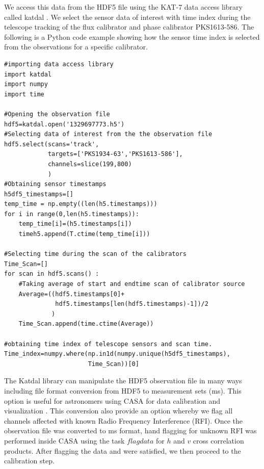 We access this data from the HDF5 file using the KAT-7 data access library called katdal \citep{molenaar2017kern}. We select the sensor data of interest with time index during the telescope tracking of the flux calibrator and phase calibrator PKS1613-586. The following is a Python code example showing how the sensor time index is selected from the observations for a specific calibrator.

\begin{tcolorbox}
\begin{lstlisting}
#importing data access library
import katdal
import numpy
import time

#Opening the observation file 
hdf5=katdal.open('1329697773.h5')
#Selecting data of interest from the the observation file
hdf5.select(scans='track',
            targets=['PKS1934-63','PKS1613-586'],
            channels=slice(199,800)
            )   
#Obtaining sensor timestamps            
h5df5_timestamps=[]
temp_time = np.empty((len(h5.timestamps)))
for i in range(0,len(h5.timestamps)):
    temp_time[i]=(h5.timestamps[i])
    timeh5.append(T.ctime(temp_time[i]))      
       
#Selecting time during the scan of the calibrators
Time_Scan=[]
for scan in hdf5.scans() :
    #Taking average of start and endtime scan of calibrator source
    Average=((hdf5.timestamps[0]+
              hdf5.timestamps[len(hdf5.timestamps)-1])/2
             ) 
    Time_Scan.append(time.ctime(Average))
    
#obtaining time index of telescope sensors and scan time.
Time_index=numpy.where(np.in1d(numpy.unique(h5df5_timestamps),
                       Time_Scan))[0]
\end{lstlisting}
\end{tcolorbox}

 The Katdal library can manipulate the HDF5 observation file in many ways including file format conversion from HDF5 to measurement sets (ms). This option is useful for astronomers using CASA for data calibration and visualization \citep{foley2016engineering}. This conversion also provide an option whereby we flag all channels affected with known Radio Frequency Interference (RFI). Once the observation file was converted to ms format, hand flagging for unknown RFI was performed inside CASA using the task $\textit{flagdata}$ for $h$ and $v$ cross correlation products. After flagging the data and were satisfied, we then proceed to the calibration step. 
 
